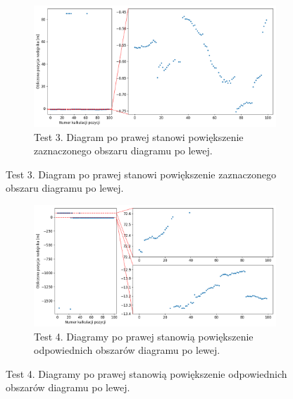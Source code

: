 \begin{figure}[H]
    \ContinuedFloat\centering
    \begin{subfigure}{\textwidth}\label{fig:position_2}
        \centering
        \includegraphics[width=0.95\linewidth]{pics/position/position_2.png}
        \caption{Test 3. Diagram po prawej stanowi powiększenie zaznaczonego obszaru diagramu po lewej.}
    \end{subfigure}
\end{figure}
\begin{figure}[H]
    \ContinuedFloat\centering
    \begin{subfigure}{\textwidth}\label{fig:position_3}
        \centering
        \includegraphics[width=0.95\linewidth]{pics/position/position_3.png}
        \caption{Test 4. Diagramy po prawej stanowią powiększenie odpowiednich obszarów diagramu po lewej.}
    \end{subfigure}
\end{figure}
